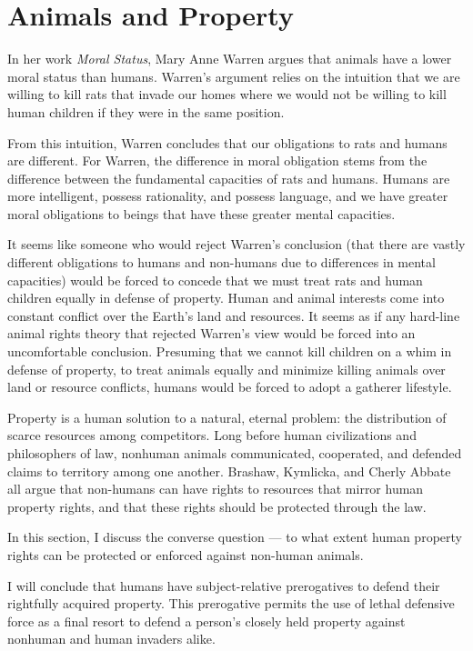 \chapter{Animals and Property}

	In her work \emph{Moral Status}, Mary Anne Warren argues that animals have
	a lower moral status than humans. Warren's argument relies on the intuition
	that we are willing to kill rats that invade our homes where we would not
	be willing to kill human children if they were in the same position.
    
	From this intuition, Warren concludes that our obligations to rats and
	humans are different. For Warren, the difference in moral obligation stems
	from the difference between the fundamental capacities of rats and humans.
	Humans are more intelligent, possess rationality, and possess language, and
	we have greater moral obligations to beings that have these greater mental
	capacities.

	It seems like someone who would reject Warren’s conclusion (that there are
	vastly different obligations to humans and non-humans due to differences in
	mental capacities) would be forced to concede that we must treat rats and
	human children equally in defense of property.  Human and animal interests
	come into constant conflict over the Earth's land and resources. It seems
	as if any hard-line animal rights theory that rejected Warren’s view would
	be forced into an uncomfortable conclusion. Presuming that we cannot kill
	children on a whim in defense of property, to treat animals equally and
	minimize killing animals over land or resource conflicts, humans would be
	forced to adopt a gatherer lifestyle.

	Property is a human solution to a natural, eternal problem: the
	distribution of scarce resources among competitors. Long before human
	civilizations and philosophers of law, nonhuman animals communicated,
	cooperated, and defended claims to territory among one
	another.\autocite[23]{bradshaw_property_rights} Brashaw, Kymlicka, and
	Cherly Abbate all argue that non-humans can have rights to resources that
	mirror human property rights, and that these rights should be protected
	through the law.

	In this section, I discuss the converse question --- to what extent human
	property rights can be protected or enforced against non-human animals.

	I will conclude that humans have subject-relative prerogatives to defend
	their rightfully acquired property. This prerogative permits the use of
	lethal defensive force as a final resort to defend a person's closely held
	property against nonhuman and human invaders alike.    

